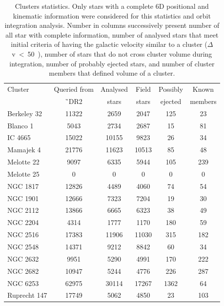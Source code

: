 \begin{table}
	\centering
	\caption{Clusters statistics. Only stars with a complete 6D positional and kinematic information were considered for this statistics and orbit integration analysis. Number in columns successively present number of all star with complete information, number of analysed stars that meet initial criteria of having the galactic velocity similar to a cluster ($\Delta$v~<~50~\kms), number of stars that do not cross cluster volume during integration, number of probably ejected stars, and number of cluster members that defined volume of a cluster.}
	\begin{tabular}{l | c | c | c | c | c }
		\hline
		Cluster & Queried from & Analysed & Field & Possibly & Known \\
		 & \G\ DR2 & stars & stars & ejected & members \\
		\hline
		Berkeley 32  & 11322 & 2659 & 2047 & 125 & 23 \\ 
		Blanco 1     & 5043 & 2734 & 2687 & 15 & 81 \\
		IC 4665      & 15022 & 10155 & 9823 & 26 & 34 \\
		Mamajek 4    & 21776 & 11623 & 10513 & 85 & 48 \\
		Melotte 22   & 9097 & 6335 & 5944 & 105 & 239 \\
		Melotte 25   & 0 & 0 & 0 & 0 & 0 \\
		NGC 1817     & 12826 & 4489 & 4060 & 74 & 54 \\
		NGC 1901     & 12666 & 7323 & 7204 & 19 & 30 \\
		NGC 2112     & 13866 & 6665 & 6323 & 38 & 49 \\
		NGC 2204     & 4314 & 1777 & 1170 & 180 & 59 \\
		NGC 2516     & 17383 & 11906 & 11030 & 315 & 182 \\
		NGC 2548     & 14371 & 9212 & 8842 & 60 & 34 \\
		NGC 2632     & 9951 & 5290 & 4991 & 170 & 222 \\
		NGC 2682     & 10947 & 5244 & 4776 & 226 & 287 \\
		NGC 6253     & 62975 & 30114 & 17267 & 1362 & 64 \\
		Ruprecht 147 & 17749 & 5062 & 4850 & 23 & 103 \\
		\hline
	\end{tabular}
	\label{tab:cluster_stats}
\end{table}

